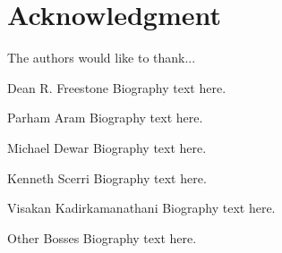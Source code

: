 \documentclass[onecolumn,draftcls]{IEEEtran}
\begin{document}
\section*{Acknowledgment}
The authors would like to thank...

\ifCLASSOPTIONcaptionsoff
  \newpage
\fi








%

\begin{IEEEbiography}{Dean R. Freestone}
Biography text here.
\end{IEEEbiography}

\begin{IEEEbiography}{Parham Aram}
Biography text here.
\end{IEEEbiography}


\begin{IEEEbiography}{Michael Dewar}
Biography text here.
\end{IEEEbiography}

\begin{IEEEbiography}{Kenneth Scerri}
Biography text here.
\end{IEEEbiography}

\begin{IEEEbiography}{Visakan Kadirkamanathani}
Biography text here.
\end{IEEEbiography}

\begin{IEEEbiography}{Other Bosses}
Biography text here.
\end{IEEEbiography}

\end{document}
